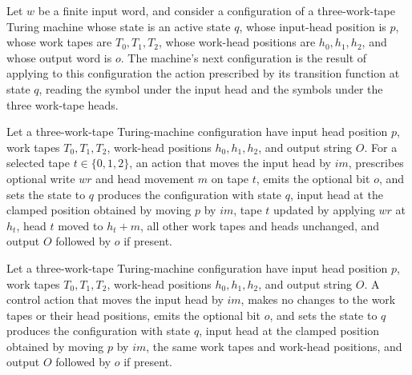 \begin{theorem}
\label{BoolCircuit.CktSatReduction.Emitter.step_some}
\leanok
{}
Let $w$ be a finite input word, and consider a configuration of a three-work-tape Turing
machine whose state is an active state $q$, whose input-head position is $p$, whose work
tapes are $T_0,T_1,T_2$, whose work-head positions are $h_0,h_1,h_2$, and whose output
word is $o$. The machine’s next configuration is the result of applying to this
configuration the action prescribed by its transition function at state $q$, reading the
symbol under the input head and the symbols under the three work-tape heads.
\end{theorem}

\begin{theorem}
\label{BoolCircuit.CktSatReduction.Emitter.apply_act}
\leanok
{}
Let a three-work-tape Turing-machine configuration have input head position $p$, work
tapes $T_0,T_1,T_2$, work-head positions $h_0,h_1,h_2$, and output string $O$. For a
selected tape $t\in\{0,1,2\}$, an action that moves the input head by $im$, prescribes
optional write $wr$ and head movement $m$ on tape $t$, emits the optional bit $o$, and
sets the state to $q$ produces the configuration with state $q$, input head at the
clamped position obtained by moving $p$ by $im$, tape $t$ updated by applying $wr$ at
$h_t$, head $t$ moved to $h_t+m$, all other work tapes and heads unchanged, and output
$O$ followed by $o$ if present.
\end{theorem}

\begin{theorem}
\label{BoolCircuit.CktSatReduction.Emitter.apply_ctl}
\leanok
{}
Let a three-work-tape Turing-machine configuration have input head position $p$, work
tapes $T_0,T_1,T_2$, work-head positions $h_0,h_1,h_2$, and output string $O$. A control
action that moves the input head by $im$, makes no changes to the work tapes or their
head positions, emits the optional bit $o$, and sets the state to $q$ produces the
configuration with state $q$, input head at the clamped position obtained by moving $p$
by $im$, the same work tapes and work-head positions, and output $O$ followed by $o$ if
present.
\end{theorem}

